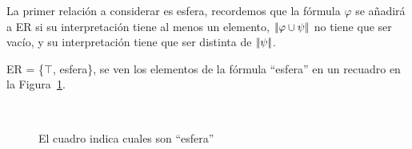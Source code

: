 %
%

La primer relaci\'on a considerar es \textsf{esfera}, recordemos que la f\'ormula $\varphi$ se a\~nadir\'a a ER si su interpretaci\'on tiene al menos un elemento, $|\!|\varphi \cup \psi|\!|$ no tiene que ser vac\'io, y su interpretaci\'on tiene que ser distinta de $|\!|\psi|\!|$. 

ER = \{$\top$, \textsf{esfera}\}, se ven los elementos de la f\'ormula ``esfera'' en un recuadro en la Figura~\ref{fig-modelo3}.

%


\begin{figure}[ht]
\begin{center}
\\[0pt]
\caption{El cuadro indica cuales son ``esfera''}
\label{fig-modelo3}
\end{center}
\end{figure}

